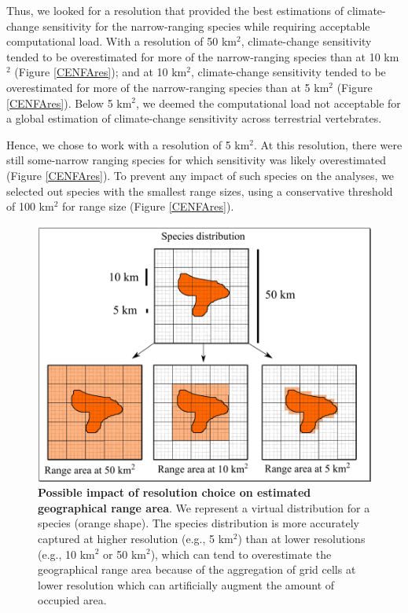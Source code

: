 \documentclass[11pt]{article}
\begin{document}
Thus, we looked for a resolution that provided the best estimations of climate-change sensitivity for the narrow-ranging species while requiring acceptable computational load. With a resolution of 50 km$^2$, climate-change sensitivity tended to be overestimated for more of the narrow-ranging species than at 10 km$^2$ (Figure \ref{CENFAres}); and at 10 km$^2$, climate-change sensitivity tended to be overestimated for more of the narrow-ranging species than at 5 km$^2$ (Figure \ref{CENFAres}). Below 5 km$^2$, we deemed the computational load not acceptable for a global estimation of climate-change sensitivity across terrestrial vertebrates.

Hence, we chose to work with a resolution of 5 km$^2$. At this resolution, there were still some-narrow ranging species for which sensitivity was likely overestimated (Figure \ref{CENFAres}). To prevent any impact of such species on the analyses, we selected out species with the smallest range sizes, using a conservative threshold of 100 km$^2$ for range size (Figure \ref{CENFAres}).

\vspace{0.5cm}
\begin{figure}[h!]
\centering
\includegraphics[scale=0.6]{Figures/ResolutionConcept.png}
\caption[Possible impact of resolution choice on estimated geographical range area]{\textbf{Possible impact of resolution choice on estimated geographical range area}. We represent a virtual distribution for a species (orange shape). The species distribution is more accurately captured at higher resolution (e.g., 5 km$^2$) than at lower resolutions (e.g., 10 km$^2$ or 50 km$^2$), which can tend to overestimate the geographical range area because of the aggregation of grid cells at lower resolution which can artificially augment the amount of occupied area.}
\label{ResolutionConcept}
\end{figure}
  
\end{document}
